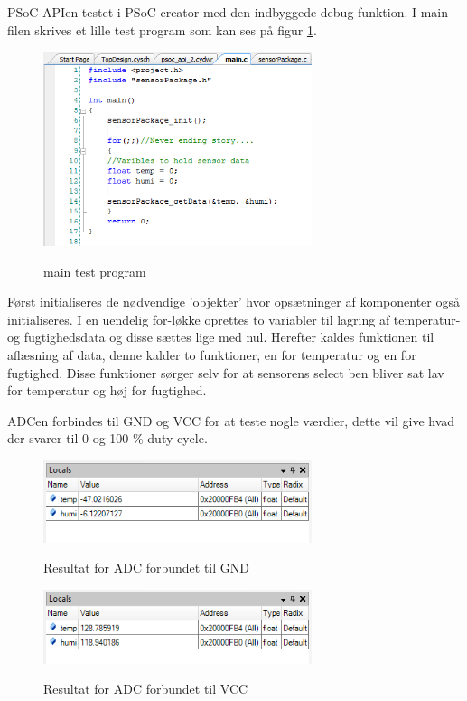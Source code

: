 
PSoC APIen testet i PSoC creator med den indbyggede debug-funktion. I main filen skrives et lille test program som kan ses på figur \ref{lab:sht_testmain}.

\begin{figure}[htb]
\centering
{\includegraphics[width=0.70\textwidth]{filer/modultest/Billeder/psoc_testmain.png}}
\caption{main test program}
\label{lab:sht_testmain}
\end{figure}

Først initialiseres de nødvendige 'objekter' hvor opsætninger af komponenter også initialiseres. I en uendelig for-løkke oprettes to variabler til lagring af temperatur- og fugtighedsdata og disse sættes lige med nul. Herefter kaldes funktionen til aflæsning af data, denne kalder to funktioner, en for temperatur og en for fugtighed. Disse funktioner sørger selv for at sensorens select ben bliver sat lav for temperatur og høj for fugtighed. 

ADCen forbindes til GND og VCC for at teste nogle værdier, dette vil give hvad der svarer til 0 og 100 \% duty cycle. 
  
\begin{figure}[htb]
\centering
{\includegraphics[width=0.70\textwidth]{filer/modultest/Billeder/psoc_api_test1.png}}
\caption{Resultat for ADC forbundet til GND}
\label{lab:sht_api_test1}
\end{figure}

\begin{figure}[htb]
\centering
{\includegraphics[width=0.70\textwidth]{filer/modultest/Billeder/psoc_api_test2.png}}
\caption{Resultat for ADC forbundet til VCC}
\label{lab:sht_api_test2}
\end{figure}

